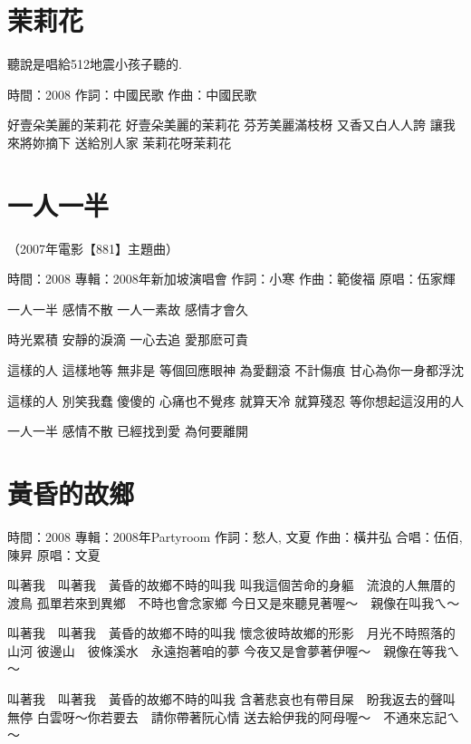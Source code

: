 \documentclass[UTF8,a4paper,oneside,twocolumn,12pt]{ctexbook}
\newcommand{\infopair}[2]{\textbullet #1：#2}
\newcommand{\zc}[1][伍佰]{\infopair{作詞}{#1}}
\newcommand{\zq}[1][伍佰]{\infopair{作曲}{#1}}
\newcommand{\zj}[1]{\infopair{專輯}{#1}}
\newcommand{\yc}[1]{\infopair{原唱}{#1}}
\newcommand{\sj}[1]{\infopair{時間}{#1}}
\newenvironment{info}{\begin{flushleft}\kaishu
	}
	{\end{flushleft}\normalsize\yahei\par}
\newenvironment{lyric}{
	}
{}
\begin{document}
\section{茉莉花}
\begin{info}

	聽說是唱給512地震小孩子聽的.

	\sj{2008}
	\zc[中國民歌]
	\zq[中國民歌]
\end{info}
\begin{lyric}
	好壹朵美麗的茉莉花
	好壹朵美麗的茉莉花
	芬芳美麗滿枝枒 又香又白人人誇
	讓我來將妳摘下 送給別人家
	茉莉花呀茉莉花
\end{lyric}

\section{一人一半}
\begin{info}
	（2007年電影【881】主題曲）

	\sj{2008}
	\zj{2008年新加坡演唱會}
	\zc[小寒]
	\zq[範俊福]
	\yc{伍家輝}
\end{info}
\begin{lyric}
	一人一半 感情不散
	一人一素故 感情才會久

	時光累積 安靜的淚滴
	一心去追 愛那麽可貴

	這樣的人 這樣地等
	無非是 等個回應眼神
	為愛翻滾 不計傷痕
	甘心為你一身都浮沈

	這樣的人 別笑我蠢
	傻傻的 心痛也不覺疼
	就算天冷 就算殘忍
	等你想起這沒用的人

	一人一半 感情不散
	已經找到愛 為何要離開
\end{lyric}

\section{黃昏的故鄉}
\begin{info}
	\sj{2008}
	\zj{2008年Partyroom}
	\zc[愁人, 文夏]
	\zq[橫井弘]
	\infopair{合唱}{伍佰, 陳昇}
	\yc{文夏}
\end{info}
\begin{lyric}
	叫著我　叫著我　黃昏的故鄉不時的叫我
	叫我這個苦命的身軀　流浪的人無厝的渡鳥
	孤單若來到異鄉　不時也會念家鄉
	今日又是來聽見著喔～　親像在叫我ㄟ～

	叫著我　叫著我　黃昏的故鄉不時的叫我
	懷念彼時故鄉的形影　月光不時照落的山河
	彼邊山　彼條溪水　永遠抱著咱的夢
	今夜又是會夢著伊喔～　親像在等我ㄟ～

	叫著我　叫著我　黃昏的故鄉不時的叫我
	含著悲哀也有帶目屎　盼我返去的聲叫無停
	白雲呀～你若要去　請你帶著阮心情
	送去給伊我的阿母喔～　不通來忘記ㄟ～
\end{lyric}
\end{document}
